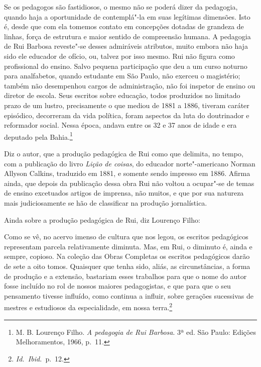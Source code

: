 \begin{hedraquote}
Se os pedagogos são fastidiosos, o mesmo não
se poderá dizer da pedagogia, quando haja a oportunidade de
contemplá"-la em suas legítimas dimensões. Isto é, desde que com ela
tomemos contato em concepções dotadas de grandeza de linhas, força de
estrutura e maior sentido de compreensão humana. A pedagogia de Rui
Barbosa reveste"-se desses admiráveis atributos, muito embora não haja
sido ele educador de ofício, ou, talvez por isso mesmo. Rui não figura
como profissional do ensino. Salvo pequena participação que deu a um
curso noturno para analfabetos, quando estudante em São Paulo, não
exerceu o magistério; também não desempenhou cargos de administração,
não foi inspetor de ensino ou diretor de escola. Seus escritos sobre
educação, todos produzidos no limitado prazo de um lustro, precisamente
o que mediou de 1881 a 1886, tiveram caráter episódico, decorreram da
vida política, foram aspectos da luta do doutrinador e reformador
social. Nessa época, andava entre os 32 e 37 anos de idade e era
deputado pela Bahia.\footnote{M. B. Lourenço Filho. \textit{A pedagogia de Rui Barbosa}. 
3ª ed. São Paulo: Edições Melhoramentos, 1966, p.~11.}
\end{hedraquote}

Diz o autor, que a produção pedagógica de Rui como que delimita, no
tempo, com a publicação do livro \textit{Lição de coisas}, do educador
norte"-americano Norman Allyson Calkins, traduzido em 1881, e somente
sendo impresso em 1886. Afirma ainda, que depois da publicação dessa
obra Rui não voltou a ocupar"-se de temas de ensino excetuados artigos
de imprensa, não muitos, e que por sua natureza mais judiciosamente se
hão de classificar na produção jornalística.

Ainda sobre a produção pedagógica de Rui, diz Lourenço Filho: 

\begin{hedraquote}
Como se vê, no acervo imenso de cultura que nos legou, os escritos pedagógicos
representam parcela relativamente diminuta. Mas, em Rui, o diminuto é,
ainda e sempre, copioso. Na coleção das Obras Completas os escritos
pedagógicos darão de sete a oito tomos. Quaisquer que tenha sido,
aliás, as circunstâncias, a forma de produção e a extensão, bastariam
esses trabalhos para que o nome do autor fosse incluído no rol de
nossos maiores pedagogistas, e que para que o seu pensamento tivesse
influído, como continua a influir, sobre gerações sucessivas de mestres
e estudiosos da especialidade, em nossa terra.\footnote{\textit{Id.~Ibid.}~p.~12.} 
\end{hedraquote}

